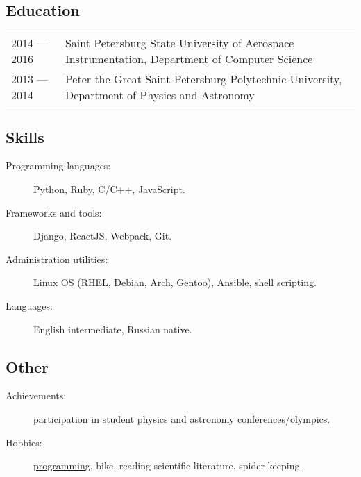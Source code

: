 \documentclass[12pt]{report}
\begin{document}
\subsection*{Education}
\begin{table}[!h]
    \begin{tabular}{p{}p{}}
        2014 --- 2016 & Saint Petersburg State University of Aerospace Instrumentation, Department of Computer Science \\
        2013 --- 2014 & Peter the Great Saint-Petersburg Polytechnic University, Department of Physics and Astronomy
    \end{tabular}
\end{table}

\subsection*{Skills}
\begin{description}
    \item[Programming languages:]
    Python, Ruby, C/C++, JavaScript.
    \item[Frameworks and tools:]
    Django, ReactJS, Webpack, Git.
    \item[Administration utilities:]
    {\noindent
    Linux OS (RHEL, Debian, Arch, Gentoo), Ansible, shell scripting.
    }
    \item[Languages:]
    English intermediate, Russian native.
\end{description}

\subsection*{Other}
\begin{description}
    \item[Achievements:]
    participation in student physics and astronomy conferences/olympics.
    \item[Hobbies:]
        \href{https://github.com/unsip}{programming}, bike, reading scientific literature, spider keeping.
\end{description}
\end{document}
